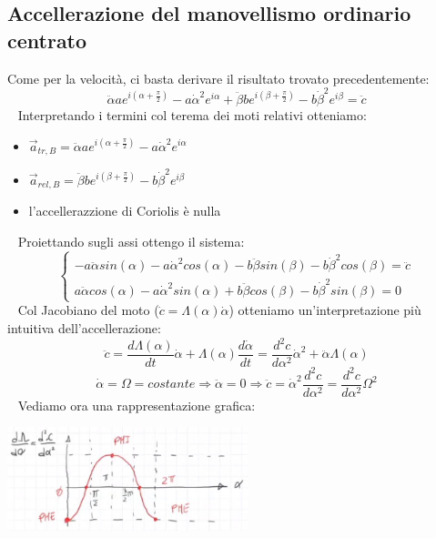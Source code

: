 \subsection{Accellerazione del manovellismo ordinario centrato}
Come per la velocità, ci basta derivare il risultato trovato precedentemente:
\[
    \ddot{\alpha} a e^{i(\alpha + \frac{\pi}{2})} - a \dot{\alpha}^2 e^{i \alpha} + \ddot{\beta} b e ^{i(\beta + \frac{\pi}{2})} - b \dot{\beta}^2 e^{i \beta} = \ddot{c} 
\]
\ \newline
Interpretando i termini col terema dei moti relativi otteniamo:
\begin{itemize}
    \item $\vec{a}_{tr,B} = \ddot{\alpha} a e^{i(\alpha + \frac{\pi}{2})} - a \dot{\alpha}^2 e^{i \alpha}$
    \item $\vec{a}_{rel,B} = \ddot{\beta} b e ^{i(\beta + \frac{\pi}{2})} - b \dot{\beta}^2 e^{i \beta}$
    \item l'accellerazzione di Coriolis è nulla
\end{itemize}
\ \newline
Proiettando sugli assi ottengo il sistema:
\[
    \begin{cases}
        - a \ddot{\alpha} sin(\alpha) - a \dot{\alpha}^2 cos(\alpha) - b \ddot{\beta} sin(\beta) - b \dot{\beta}^2 cos(\beta) = \ddot{c}\\
        a \ddot{\alpha} cos(\alpha) - a \dot{\alpha}^2 sin(\alpha) + b \ddot{\beta} cos(\beta) - b \dot{\beta}^2 sin(\beta) = 0
    \end{cases}
\]
\ \newline
Col Jacobiano del moto ($\dot{c} = \Lambda(\alpha) \dot{\alpha}$) otteniamo un'interpretazione più intuitiva dell'accellerazione:
\[
    \ddot{c} = \frac{d\Lambda (\alpha)}{dt} \dot{\alpha} + \Lambda (\alpha) \frac{d \dot{\alpha}}{dt} = \frac{d^2c}{d \alpha^2} \dot{\alpha}^2 + \ddot{\alpha} \Lambda (\alpha)
\]
\[
    \dot{\alpha} = \Omega = costante \Rightarrow \ddot{\alpha} = 0 \Rightarrow \ddot{c} = \dot{\alpha}^2 \frac{d^2 c}{d \alpha^2} = \frac{d^2 c}{d \alpha^2} \Omega^2
\]
\ \newline
Vediamo ora una rappresentazione grafica:
\begin{center}
    \includegraphics[height=3cm]{../lezione5/img5.JPG}
\end{center}
